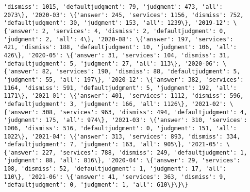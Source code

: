 \documentclass[11pt]{article}
\begin{document}
\begin{Verbatim}[commandchars=\\\{\}]
'dismiss': 1015, 'defaultjudgment': 79, 'judgment': 473, 'all': 2073\}, '2020-03': \{'answer': 245, 'services': 1156, 'dismiss': 752, 'defaultjudgment': 30, 'judgment': 153, 'all': 1239\}, '2019-12': \{'answer': 2, 'services': 4, 'dismiss': 2, 'defaultjudgment': 0, 'judgment': 2, 'all': 4\}, '2020-08': \{'answer': 197, 'services': 421, 'dismiss': 188, 'defaultjudgment': 10, 'judgment': 106, 'all': 426\}, '2020-05': \{'answer': 31, 'services': 104, 'dismiss': 31, 'defaultjudgment': 5, 'judgment': 27, 'all': 113\}, '2020-06': \{'answer': 82, 'services': 190, 'dismiss': 88, 'defaultjudgment': 5, 'judgment': 55, 'all': 197\}, '2020-12': \{'answer': 382, 'services': 1164, 'dismiss': 591, 'defaultjudgment': 5, 'judgment': 192, 'all': 1171\}, '2021-01': \{'answer': 401, 'services': 1112, 'dismiss': 596, 'defaultjudgment': 3, 'judgment': 166, 'all': 1126\}, '2021-02': \{'answer': 308, 'services': 963, 'dismiss': 494, 'defaultjudgment': 4, 'judgment': 175, 'all': 974\}, '2021-03': \{'answer': 310, 'services': 1006, 'dismiss': 516, 'defaultjudgment': 0, 'judgment': 151, 'all': 1022\}, '2021-04': \{'answer': 313, 'services': 893, 'dismiss': 334, 'defaultjudgment': 7, 'judgment': 163, 'all': 905\}, '2021-05': \{'answer': 227, 'services': 788, 'dismiss': 249, 'defaultjudgment': 1, 'judgment': 88, 'all': 816\}, '2020-04': \{'answer': 29, 'services': 108, 'dismiss': 52, 'defaultjudgment': 1, 'judgment': 17, 'all': 110\}, '2021-06': \{'answer': 41, 'services': 363, 'dismiss': 9, 'defaultjudgment': 0, 'judgment': 1, 'all': 610\}\}\}

    \end{Verbatim}
\end{document}
